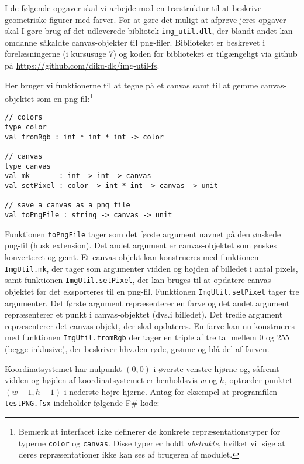 I de følgende opgaver skal vi arbejde med en træstruktur til at beskrive geometriske
figurer med farver.  For at gøre det muligt at afprøve jeres opgaver
skal I gøre brug af det udleverede bibliotek \texttt{img\_util.dll}, der
blandt andet kan omdanne såkaldte canvas-objekter til png-filer.  Biblioteket er
beskrevet i forelæsningerne (i kursusuge 7) og koden for biblioteket er tilgængeligt via github på \url{https://github.com/diku-dk/img-util-fs}.

Her bruger vi funktionerne til at tegne på et canvas samt til at gemme
canvas-objektet som en png-fil:\footnote{Bemærk at interfacet ikke
definerer de konkrete repræsentationstyper for
typerne \lstinline{color} og \lstinline{canvas}. Disse typer er
holdt \emph{abstrakte}, hvilket vil sige at deres repræsentationer
ikke kan ses af brugeren af modulet.}

\begin{lstlisting}[numbers=none,frame=none,mathescape]
// colors
type color
val fromRgb : int * int * int -> color

// canvas
type canvas
val mk       : int -> int -> canvas
val setPixel : color -> int * int -> canvas -> unit

// save a canvas as a png file
val toPngFile : string -> canvas -> unit
\end{lstlisting}

Funktionen \lstinline{toPngFile} tager som det første argument navnet
på den ønskede png-fil (husk extension).  Det andet argument er
canvas-objektet som ønskes konverteret og gemt. Et canvas-objekt kan
konstrueres med funktionen \lstinline{ImgUtil.mk}, der tager som
argumenter vidden og højden af billedet i antal pixels, samt funktionen
\lstinline{ImgUtil.setPixel}, der kan bruges til at opdatere canvas-objektet
før det eksporteres til en png-fil. Funktionen \lstinline{ImgUtil.setPixel}
tager tre argumenter. Det første argument repræsenterer en farve og
det andet argument repræsenterer et punkt i canvas-objektet (dvs.\@ i
billedet). Det tredie argument repræsenterer det canvas-objekt, der
skal opdateres.  En farve kan nu konstrueres med funktionen
\lstinline{ImgUtil.fromRgb} der tager en triple af tre tal mellem 0 og
255 (begge inklusive), der beskriver hhv.\@ den røde, grønne og blå del
af farven.

Koordinatsystemet har nulpunkt $(0,0)$ i øverste venstre hjørne og,
såfremt vidden og højden af koordinatsystemet er henholdsvis $w$ og
$h$, optræder punktet $(w-1,h-1)$ i nederste højre hjørne.  Antag for
eksempel at programfilen \texttt{testPNG.fsx} indeholder følgende F\#
kode:

